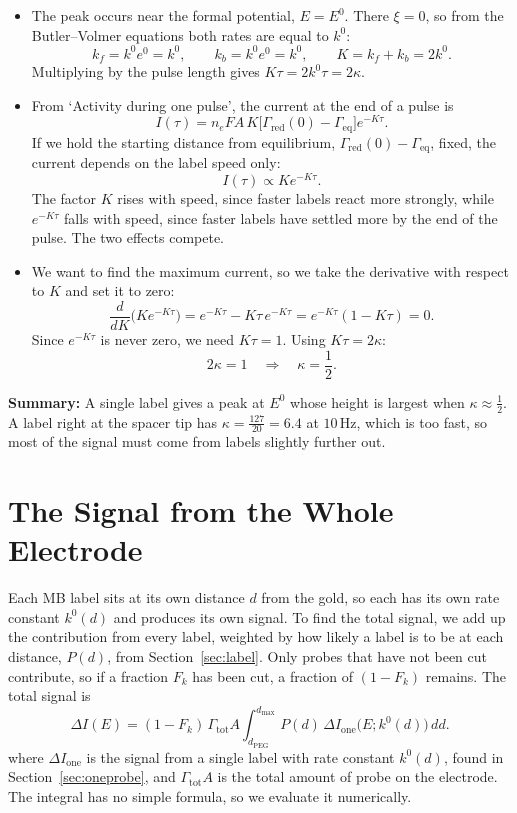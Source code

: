 \documentclass[10pt,a4paper]{article}
\numberwithin{equation}{section}
\newcommand{\dpeg}{d_{\mathrm{PEG}}}
\newcommand{\Gtot}{\Gamma_{\mathrm{tot}}}
\newcommand{\Gred}{\Gamma_{\mathrm{red}}}
\newcommand{\Geq}{\Gamma_{\mathrm{eq}}}
\newcommand{\dropdown}{\par\medskip}
\begin{document}
\dropdown
\begin{itemize}
  \item The peak occurs near the formal potential, $E = E^0$. There $\xi = 0$, so from the Butler--Volmer equations both rates are equal to $k^0$:
  \[ k_f = k^0e^0 = k^0, \qquad k_b = k^0e^0 = k^0, \qquad K = k_f + k_b = 2k^0. \]
  Multiplying by the pulse length gives $K\tau = 2k^0\tau = 2\kappa$.
  \item From `Activity during one pulse', the current at the end of a pulse is
  \[ I(\tau) = n_eFA\,K\big[\Gred(0) - \Geq\big]e^{-K\tau}. \]
  If we hold the starting distance from equilibrium, $\Gred(0) - \Geq$, fixed, the current depends on the label speed only:
  \[ I(\tau) \propto Ke^{-K\tau}. \]
  The factor $K$ rises with speed, since faster labels react more strongly, while $e^{-K\tau}$ falls with speed, since faster labels have settled more by the end of the pulse. The two effects compete.
  \item We want to find the maximum current, so we take the derivative with respect to $K$ and set it to zero:
  \[ \frac{d}{dK}\big(Ke^{-K\tau}\big) = e^{-K\tau} - K\tau\,e^{-K\tau} = e^{-K\tau}(1 - K\tau) = 0. \]
  Since $e^{-K\tau}$ is never zero, we need $K\tau = 1$. Using $K\tau = 2\kappa$:
  \[ 2\kappa = 1 \quad\Longrightarrow\quad \kappa = \frac12. \]
\end{itemize}

\textbf{Summary:} A single label gives a peak at $E^0$ whose height is largest when $\kappa\approx\frac12$. A label right at the spacer tip has $\kappa = \frac{127}{20} = 6.4$ at $10\,\mathrm{Hz}$, which is too fast, so most of the signal must come from labels slightly further out.

\section{The Signal from the Whole Electrode}

Each MB label sits at its own distance $d$ from the gold, so each has its own rate constant $k^0(d)$ and produces its own signal. To find the total signal, we add up the contribution from every label, weighted by how likely a label is to be at each distance, $P(d)$, from Section~\ref{sec:label}. Only probes that have not been cut contribute, so if a fraction $F_k$ has been cut, a fraction of $(1 - F_k)$ remains. The total signal is
\[ \Delta I(E) = (1 - F_k)\,\Gtot A\int_{\dpeg}^{d_{\max}}P(d)\,\Delta I_{\mathrm{one}}\big(E;k^0(d)\big)\,dd. \]
where $\Delta I_{\mathrm{one}}$ is the signal from a single label with rate constant $k^0(d)$, found in Section~\ref{sec:oneprobe}, and $\Gtot A$ is the total amount of probe on the electrode. The integral has no simple formula, so we evaluate it numerically.
\end{document}
